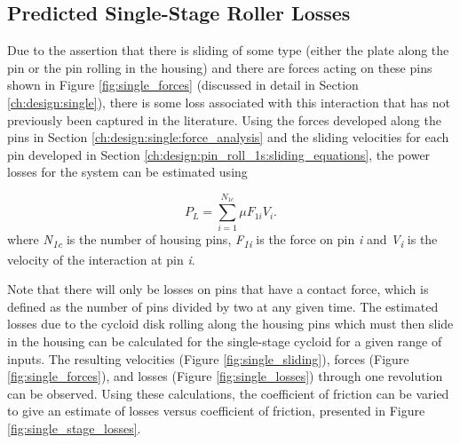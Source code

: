 \subsection{Predicted Single-Stage Roller Losses} \label{ch:design:pin_roll_1s:predicted_losses}

Due to the assertion that there is sliding of some type (either the plate along the pin or the pin rolling in the housing) and there are forces acting on these pins shown in Figure \ref{fig:single_forces} (discussed in detail in Section \ref{ch:design:single}), there is some loss associated with this interaction that has not previously been captured in the literature. Using the forces developed along the pins in Section \ref{ch:design:single:force_analysis} and the sliding velocities for each pin developed in Section \ref{ch:design:pin_roll_1s:sliding_equations}, the power losses for the system can be estimated using 

\begin{equation} \label{eq:single_power_loss}
P_L = \sum_{i=1}^{N_{1c}}\mu F_{1i} V_i.
\end{equation}
where \textit{N\textsubscript{1c}} is the number of housing pins, \textit{F\textsubscript{1i}} is the force on pin \textit{i} and \textit{V\textsubscript{i}} is the velocity of the interaction at pin \textit{i}.

Note that there will only be losses on pins that have a contact force, which is defined as the number of pins divided by two at any given time. The estimated losses due to the cycloid disk rolling along the housing pins which must then slide in the housing can be calculated for the single-stage cycloid for a given range of inputs. The resulting velocities (Figure \ref{fig:single_sliding}), forces (Figure \ref{fig:single_forces}), and losses (Figure \ref{fig:single_losses}) through one revolution can be observed. Using these calculations, the coefficient of friction can be varied to give an estimate of losses versus coefficient of friction, presented in Figure \ref{fig:single_stage_losses}.

